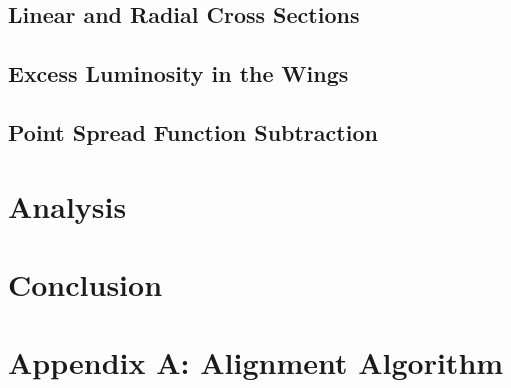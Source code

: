 \documentclass[a4paper,11pt]{article}
\begin{document}
\subsection{Linear and Radial Cross Sections}
\subsection{Excess Luminosity in the Wings}
\subsection{Point Spread Function Subtraction}
\section{Analysis}
\section{Conclusion}




\section*{Appendix A: Alignment Algorithm}
\end{document}
